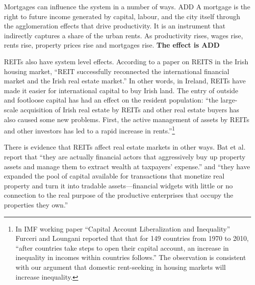 Mortgages can influence the system in a number of ways. ADD %
A mortgage is the right to future income generated by capital, labour, and the city itself through the agglomeration effects that drive productivity. It is an instrument that indirectly captures a share of the urban rents. As productivity rises, wages rise, rents rise, property prices rise and mortgages rise. \textbf{The effect is ADD}

REITs also have system level effects. %
According to a paper \cite{wangAnalyzeImpactREITs2021} on REITS in the Irish housing market, ``REIT successfully reconnected the international financial market and the Irish real estate market.'' In other words, in Ireland, REITs have made it easier for international capital to buy Irish land. The entry of outside and footloose capital has had an effect on the resident population:  ``the large-scale acquisition of Irish real estate by REITs and other real estate buyers has also caused some new problems. First, the active management of assets by REITs and other investors has led to a rapid increase in rents.''\footnote{In  IMF working paper ``Capital Account Liberalization and Inequality'' \cite{furceriCapitalAccountLiberalization2015}  Furceri and Loungani reported that that for 149 countries from 1970 to 2010, ``after countries take steps to open their capital account, an increase in inequality in incomes within countries follows.'' The observation is consistent with our argument  that domestic \gls{rent-seeking} in housing markets will increase inequality.}  

There is evidence that REITs affect real estate markets in other ways. Bat et al.  \cite{batRolePublicREITs2022} report that  ``they are actually financial actors that aggressively buy up property assets and manage them to extract wealth at taxpayers' expense.'' and ``they have expanded the pool of capital available for transactions that monetize real property and turn it into tradable assets---financial widgets with little or no connection to the real purpose of the productive enterprises that occupy the properties they own.''



